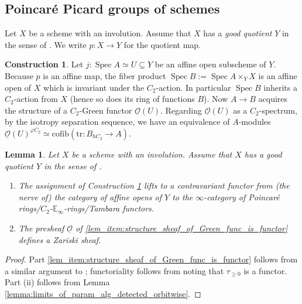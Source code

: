 \documentclass{article}
\DeclareMathOperator{\Spec}{Spec}
\newcommand{\EE}{\mathbb{E}}
\newtheorem{lemma}[equation]{Lemma}
\theoremstyle{definition}
\newtheorem{construction}[equation]{Construction}
\newcommand{\Lucy}[1]{\todo[color=cyan]{\linespread{1}\footnotesize L: #1}}
\begin{document}
\subsection{Poincaré Picard groups of schemes} 
Let $ X $ be a scheme with an involution. 
Assume that $ X $ has a \emph{good quotient} $ Y $ in the sense of \cite[Remark 4.20]{azumaya_involution}. 
We write $ p \colon X \to Y $ for the quotient map. 
\begin{construction}\label{cons:structure_sheaf_of_Green_functors}
    Let $ j \colon \Spec A  \simeq U \subseteq Y $ be an affine open subscheme of $ Y $. 
    Because $ p $ is an affine map,\Lucy{by assumption!} the fiber product $ \Spec B := \Spec A \times_{Y} X $ is an affine open of $ X $ which is invariant under the $ C_2 $-action. 
    In particular $ \Spec B $ inherits a $ C_2 $-action from $ X $ (hence so does its ring of functions $ B$).  
    Now $ A \to B $ acquires the structure of a $C_2$-Green functor $ \underline{\mathcal{O}}(U) $. 
    Regarding $ \underline{\mathcal{O}}(U) $ as a $ C_2 $-spectrum, by the isotropy separation sequence, we have an equivalence of $ A $-modules $ \underline{\mathcal{O}}(U)^{\varphi C_2} \simeq \mathrm{cofib} (\mathrm{tr} \colon B_{hC_2} \to A) $. 
\end{construction}
\begin{lemma} \label{lemma:identify_structure_sheaf_of_Green_func}
Let $ X $ be a scheme with an involution. 
Assume that $ X $ has a \emph{good quotient} $ Y $ in the sense of \cite[Remark 4.20]{azumaya_involution}. 
\begin{enumerate}[label=(\roman*)]
    \item \label{lem_item:structure_sheaf_of_Green_func_is_functor} The assignment of Construction \ref{cons:structure_sheaf_of_Green_functors} lifts to a contravariant functor from (the nerve of) the category of affine opens of $ Y $ to the $\infty $-category of Poincaré rings/$ C_2 $-$ \EE_\infty $-rings/Tambara functors. 
    \item \label{lem_item:structure_sheaf_of_Green_func_is_sheaf} The presheaf $ \underline{\mathcal{O}} $ of \ref{lem_item:structure_sheaf_of_Green_func_is_functor} defines a Zariski sheaf. 
\end{enumerate}
\end{lemma}
\begin{proof}
    Part \ref{lem_item:structure_sheaf_of_Green_func_is_functor} follows from a similar argument to \cite[Theorem 5.1]{LYang_normedrings}; functoriality follows from noting that $ \tau_{\geq 0} $ is a functor.  
    Part (ii) follows from Lemma \ref{lemma:limits_of_param_alg_detected_orbitwise}. 
\end{proof}
\end{document}

